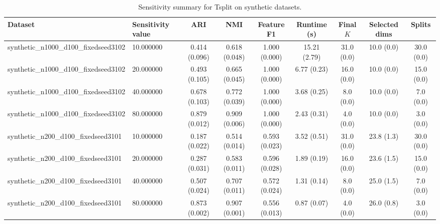\begin{table}[t]
\centering
\caption{Sensitivity summary for Tsplit on synthetic datasets.}
\label{tab:sens-Tsplit-synthetic}
\begin{tabular}{llccccccc}
\toprule
Dataset & Sensitivity value & ARI & NMI & Feature F1 & Runtime (s) & Final $K$ & Selected dims & Splits \\
\midrule
synthetic_n1000_d100_fixedseed3102 & 10.000000 & 0.414 (0.096) & 0.618 (0.048) & 1.000 (0.000) & 15.21 (2.79) & 31.0 (0.0) & 10.0 (0.0) & 30.0 (0.0) \\
synthetic_n1000_d100_fixedseed3102 & 20.000000 & 0.493 (0.105) & 0.665 (0.045) & 1.000 (0.000) & 6.77 (0.23) & 16.0 (0.0) & 10.0 (0.0) & 15.0 (0.0) \\
synthetic_n1000_d100_fixedseed3102 & 40.000000 & 0.678 (0.103) & 0.772 (0.039) & 1.000 (0.000) & 3.68 (0.25) & 8.0 (0.0) & 10.0 (0.0) & 7.0 (0.0) \\
synthetic_n1000_d100_fixedseed3102 & 80.000000 & 0.879 (0.012) & 0.909 (0.006) & 1.000 (0.000) & 2.43 (0.31) & 4.0 (0.0) & 10.0 (0.0) & 3.0 (0.0) \\
synthetic_n200_d100_fixedseed3101 & 10.000000 & 0.187 (0.022) & 0.514 (0.014) & 0.593 (0.023) & 3.52 (0.51) & 31.0 (0.0) & 23.8 (1.3) & 30.0 (0.0) \\
synthetic_n200_d100_fixedseed3101 & 20.000000 & 0.287 (0.031) & 0.583 (0.011) & 0.596 (0.028) & 1.89 (0.19) & 16.0 (0.0) & 23.6 (1.5) & 15.0 (0.0) \\
synthetic_n200_d100_fixedseed3101 & 40.000000 & 0.507 (0.024) & 0.707 (0.011) & 0.572 (0.024) & 1.31 (0.14) & 8.0 (0.0) & 25.0 (1.5) & 7.0 (0.0) \\
synthetic_n200_d100_fixedseed3101 & 80.000000 & 0.873 (0.002) & 0.907 (0.001) & 0.556 (0.013) & 0.87 (0.07) & 4.0 (0.0) & 26.0 (0.8) & 3.0 (0.0) \\
\bottomrule
\end{tabular}
\end{table}
